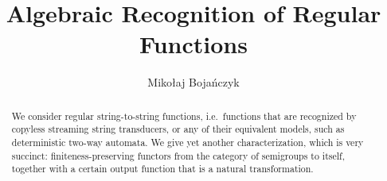 \documentclass[a4paper,USenglish,cleveref,autoref,thm-restate,numberwithinsect,anonymous]{lipics-v2021}
\title{Algebraic Recognition of Regular Functions} %
\author{Mikołaj Bojańczyk}{Institute of Informatics, University of Warsaw, Poland \and \url{https://www.mimuw.edu.pl/~bojan/}}{bojan@mimuw.edu.pl}{}{{\color{red}(Optional) author-specific funding acknowledgements}}%
\begin{document}
\maketitle

\begin{abstract}
    We consider regular string-to-string functions, i.e.~functions that are recognized by copyless streaming string transducers, or  any of their equivalent models, such as deterministic two-way automata. We give yet another characterization, which is very succinct: finiteness-preserving functors from the category of semigroups to itself, together with a certain output function that is a natural transformation.
\end{abstract}

\newcommand{\moncat}{\mathrm{Mon}}
\newcommand{\semcat}{\mathrm{Sem}}











\appendix

\newpage





\end{document}
